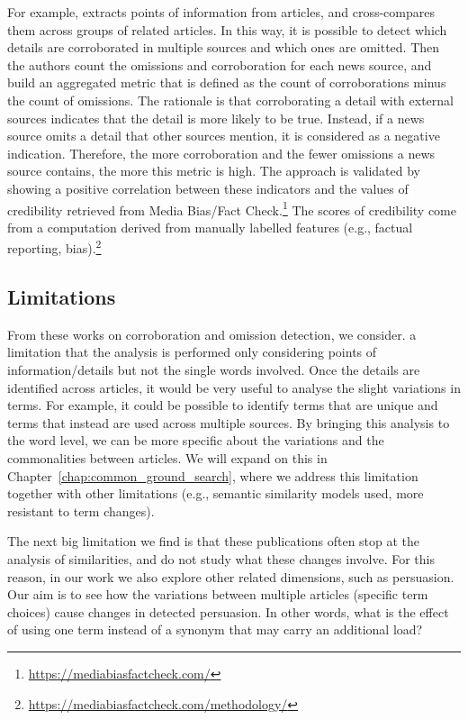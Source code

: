 For example, \cite{bountouridis2018explaining} extracts points of information from articles, and cross-compares them across groups of related articles. In this way, it is possible to detect which details are corroborated in multiple sources and which ones are omitted.
Then the authors count the omissions and corroboration for each news source, and build an aggregated metric that is defined as the count of corroborations minus the count of omissions.
The rationale is that corroborating a detail with external sources indicates that the detail is more likely to be true.
Instead, if a news source omits a detail that other sources mention, it is considered as a negative indication.
Therefore, the more corroboration and the fewer omissions a news source contains, the more this metric is high.
The approach is validated by showing a positive correlation between these indicators and the values of credibility retrieved from Media Bias/Fact Check.\footnote{\url{https://mediabiasfactcheck.com/}}
The scores of credibility come from a computation derived from manually labelled features (e.g., factual reporting, bias).\footnote{\url{https://mediabiasfactcheck.com/methodology/}}

\subsection{\statusgreen Limitations}

From these works on corroboration and omission detection, we consider. a limitation that the analysis is performed only considering points of information/details but not the single words involved.
Once the details are identified across articles, it would be very useful to analyse the slight variations in terms.
For example, it could be possible to identify terms that are unique and terms that instead are used across multiple sources. By bringing this analysis to the word level, we can be more specific about the variations and the commonalities between articles.
We will expand on this in Chapter~\ref{chap:common_ground_search}, where we address this limitation together with other limitations (e.g., semantic similarity models used, more resistant to term changes).

The next big limitation we find is that these publications often stop at the analysis of similarities, and do not study what these changes involve.
For this reason, in our work we also explore other related dimensions, such as persuasion.
Our aim is to see how the variations between multiple articles (specific term choices) cause changes in detected persuasion. In other words, what is the effect of using one term instead of a synonym that may carry an additional load?


